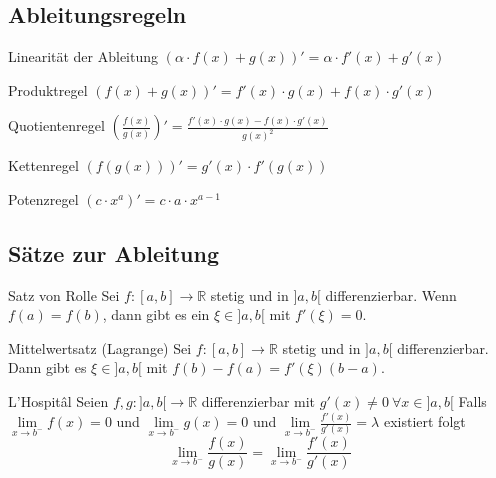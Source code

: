 \documentclass[a4paper,10pt]{article}
\def\R{\mathbb{R}}
\begin{document}
\subsection{Ableitungsregeln}

\begin{subbox}{Linearität der Ableitung}
 $(\alpha \cdot f(x) + g(x))' = \alpha \cdot f'(x) + g'(x)$
\end{subbox}

\begin{mainbox}{Produktregel}
 $(f(x) + g(x))' = f'(x) \cdot g(x) + f(x) \cdot g'(x)$
\end{mainbox}

\begin{mainbox}{Quotientenregel}
 $\left(\frac{f(x)}{g(x)}\right)' = \frac{f'(x) \cdot g(x) - f(x) \cdot g'(x)}{g(x)^2}$
\end{mainbox}

\begin{mainbox}{Kettenregel}
 $(f(g(x)))' = g'(x) \cdot f'(g(x))$
\end{mainbox}

\begin{subbox}{Potenzregel}
 $(c \cdot x^a)' = c \cdot a \cdot x^{a - 1}$
\end{subbox}

\subsection{Sätze zur Ableitung}
\begin{subbox}{Satz von Rolle}
 Sei $f: [a,b] \to \R$ stetig und in $]a,b[$ differenzierbar. Wenn $f(a) = f(b)$, dann gibt es ein $\xi \in ]a,b[$ mit $f'(\xi) = 0$.
\end{subbox}
\begin{mainbox}{Mittelwertsatz (Lagrange)}
 Sei $f: [a,b] \to \R$ stetig und in $]a,b[$ differenzierbar. Dann gibt es $\xi \in ]a,b[$ mit $f(b) - f(a) = f'(\xi)(b-a)$.
\end{mainbox}

\begin{mainbox}{L'Hospitâl}
  Seien $f,g: ]a,b[ \to \R$ differenzierbar mit $g'(x) \neq 0 \> \forall x\in]a,b[$
  Falls $\lim\limits_{x\to b^-} f(x) = 0$ und $\lim\limits_{x\to b^-} g(x) = 0$ und $\lim\limits_{x\to b^-} \frac{f'(x)}{g'(x)} = \lambda$ existiert folgt \[\lim\limits_{x\to b^-} \frac{f(x)}{g(x)} = \lim\limits_{x\to b^-} \frac{f'(x)}{g'(x)}\]
\end{mainbox}
\end{document}
